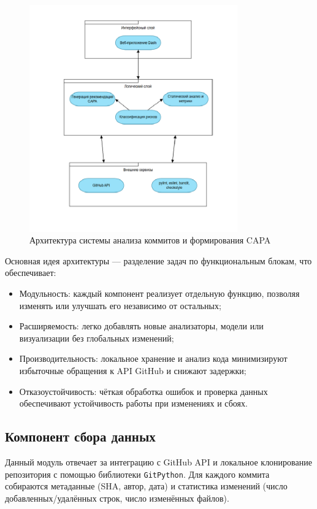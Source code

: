 \begin{figure}[ht]
	\centering
	\includegraphics[width=0.8\textwidth]{my_folder/images/architect.png}
	\caption{Архитектура системы анализа коммитов и формирования CAPA}
	\label{fig:architecture_diagram}
\end{figure}

Основная идея архитектуры — разделение задач по функциональным блокам, что обеспечивает:

\begin{itemize}
	\item Модульность: каждый компонент реализует отдельную функцию, позволяя изменять или улучшать его независимо от остальных;
	\item Расширяемость: легко добавлять новые анализаторы, модели или визуализации без глобальных изменений;
	\item Производительность: локальное хранение и анализ кода минимизируют избыточные обращения к API GitHub и снижают задержки;
	\item Отказоустойчивость: чёткая обработка ошибок и проверка данных обеспечивают устойчивость работы при изменениях и сбоях.
\end{itemize}

\subsection{Компонент сбора данных}

Данный модуль отвечает за интеграцию с GitHub API и локальное клонирование репозитория с помощью библиотеки \texttt{GitPython}. Для каждого коммита собираются метаданные (SHA, автор, дата) и статистика изменений (число добавленных/удалённых строк, число изменённых файлов).

